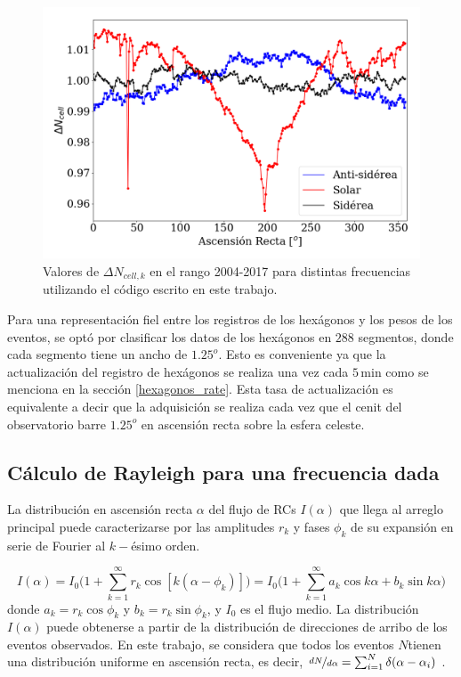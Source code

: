        \begin{figure}[H]
          \centering
              \includegraphics[width=0.75\linewidth]{weigths_2020.png}
              \caption{Valores de $\Delta N_{cell, k}$ en el rango 2004-2017 para distintas frecuencias utilizando el código escrito en este trabajo.}
              \label{fig:pesos_ejemplo}
        \end{figure}

    Para una representación fiel entre los registros de los hexágonos y los pesos de los eventos, se optó por clasificar los datos de los hexágonos en $288$ segmentos, donde cada segmento tiene un ancho de $1.25^o$. Esto es conveniente ya que la actualización del registro de hexágonos se realiza una vez  cada $5\,$min como se menciona en la sección \ref{hexagonos_rate}. Esta tasa de actualización es equivalente a decir que la adquisición se realiza cada vez que el cenit del observatorio barre  $1.25^o$ en ascensión recta sobre la esfera celeste.



  \subsection{Cálculo de Rayleigh para una frecuencia dada} \label{rayleigh}

  La distribución en ascensión recta $\alpha$ del flujo de RCs $I(\alpha)$ que llega al arreglo principal puede caracterizarse por las amplitudes $r_k$ y fases $\phi_k$ de su expansión en serie de Fourier al $k-$ésimo orden. 

  \begin{equation}
    I(\alpha) = I_0 \bigg ( 1+ \sum^\infty_{k=1} r_k\cos{[k(\alpha - \phi_k)]} \bigg) = I_0 \bigg ( 1+ \sum^\infty_{k=1} a_k\cos{k\alpha} +  b_k\sin{k\alpha} \bigg ) 
  \end{equation}
  donde $a_k=r_k\cos\phi_k$ y $b_k=r_k\sin\phi_k$, y $I_0$ es el flujo medio. La distribución $I(\alpha)$ puede obtenerse a partir de la distribución de direcciones de arribo de los eventos observados. En este trabajo, se considera que todos los eventos $N$tienen una distribución uniforme en ascensión recta, es decir, $\nicefrac{dN}{d\alpha}= \sum^N_{i=1} \delta(\alpha - \alpha_i)$ \cite{taborda}. 


